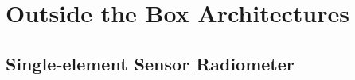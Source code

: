   
 
   




\section{Outside the Box Architectures}

\subsection{Single-element Sensor  Radiometer}
  
